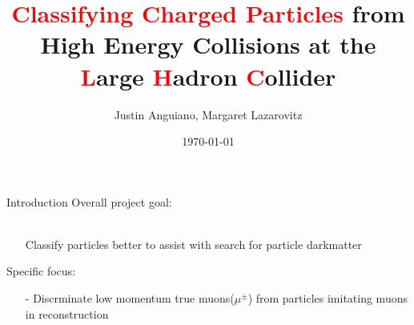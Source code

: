 \documentclass[10pt,handout]{beamer}
\author{Justin Anguiano, Margaret Lazarovitz}
\title{\textcolor{red}{Classifying Charged Particles} from High Energy Collisions at the \textcolor{red}{L}arge \textcolor{red}{H}adron \textcolor{red}{C}ollider }
\institute{University of Kansas}
\date{\today}
\begin{document}
\begin{frame}
\titlepage
\end{frame}



\begin{frame}{Introduction}
Overall project goal:\\
\quad \quad \\
\begin{itemize}
\item[] Classify particles better to assist with search for particle
 darkmatter
\item[] \quad
\end{itemize}
Specific focus:
 \begin{itemize}
	
	\item[] \quad
	\item[-] Discrminate low momentum true muons($\mu^\pm$) from particles imitating muons in reconstruction
\end{itemize}


\end{frame}
\end{document}
